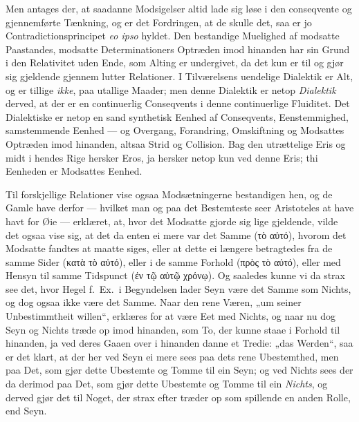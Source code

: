 \documentclass[12pt,a4paper]{book}
\newcommand{\apage}[1]{\marginnote{\footnotesize\textit{[#1]}}}
\begin{document}
Men antages der, at saadanne Modsigelser altid lade sig løse i den
conseqvente og gjennemførte Tænkning, og er det Fordringen, at de skulle
det, saa er jo Contradictionsprincipet \textit{eo ipso} hyldet. Den
bestandige Muelighed af modsatte Paastandes, modsatte Determinationers
Optræden imod hinanden har sin Grund i den Relativitet uden Ende, som
Alting er undergivet, da det kun er til og gjør sig gjeldende gjennem
lutter Relationer. I Tilværelsens uendelige Dialektik er Alt, og er tillige
\emph{ikke}, paa utallige Maader; men denne Dialektik er netop \emph{Dialektik} derved,
at der er en continuerlig Conseqvents i denne continuerlige Fluiditet. Det
Dialektiske er netop en sand synthetisk Eenhed af Conseqvents,
Eenstemmighed, samstemmende Eenhed --- og Overgang, Forandring, Omskiftning
og Modsattes Optræden imod hinanden, altsaa Strid og Collision. Bag den
utrættelige Eris og midt i hendes Rige hersker Eros, ja hersker netop kun
ved denne Eris; thi Eenheden er Modsattes Eenhed.

Til forskjellige Relationer vise ogsaa Modsætningerne bestandigen hen, og
de Gamle have derfor --- hvilket man og paa det Bestemteste seer Aristoteles
at have havt for Øie --- erklæret, at, hvor det Modsatte gjorde sig lige
gjeldende, vilde det ogsaa vise sig, at det da enten ei mere var det Samme
(τὸ αὐτό), hvorom \apage{81} det Modsatte fandtes at maatte siges, eller at dette ei
længere betragtedes fra de samme Sider (κατὰ τὸ αὐτό), eller i de samme
Forhold (πρὸς τὸ αὐτό), eller med Hensyn til samme Tidspunct (ἐν τῷ αὐτῷ
χρόνῳ). Og saaledes kunne vi da strax see det, hvor Hegel f.\ Ex.\ i
Begyndelsen lader Seyn være det Samme som Nichts, og dog ogsaa ikke være
det Samme. Naar den rene Væren, „um seiner Unbestimmtheit willen“, erklæres
for at være Eet med Nichts, og naar nu dog Seyn og Nichts træde op imod
hinanden, som To, der kunne staae i Forhold til hinanden, ja ved deres
Gaaen over i hinanden danne et Tredie: „das Werden“, saa er det klart, at
der her ved Seyn ei mere sees paa dets rene Ubestemthed, men paa Det, som
gjør dette Ubestemte og Tomme til ein Seyn; og ved Nichts sees der da
derimod paa Det, som gjør dette Ubestemte og Tomme til ein \emph{Nichts}, og
derved gjør det til Noget, der strax efter træder op som spillende en anden
Rolle, end Seyn.
\end{document}
